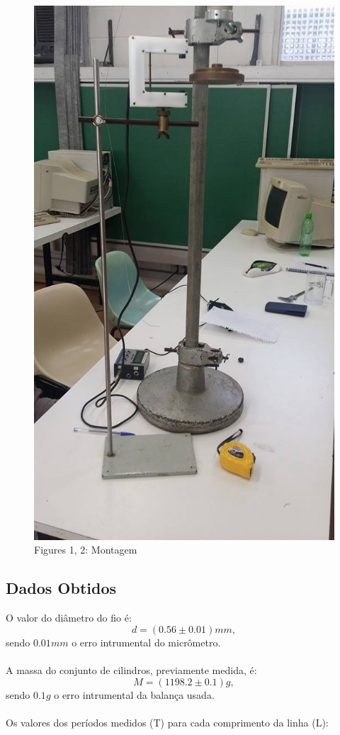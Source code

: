 \documentclass[12pt,a4paper]{article}
\begin{document}
\begin{figure}[!htbp]
	\includegraphics[scale=0.30]{02.jpg}\\
	Figures 1, 2: Montagem
\end{figure}

\subsection{Dados Obtidos}
O valor do diâmetro do fio é:
$$ d = (0.56 \pm 0.01) mm, $$
sendo $0.01 mm$ o erro intrumental do micrômetro.\\\\
A massa do conjunto de cilindros, previamente medida, é:
$$ M = (1198.2 \pm 0.1) g,$$
sendo $0.1 g$ o erro intrumental da balança usada.\\\\
Os valores dos períodos medidos (T) para cada comprimento da linha (L): %
\end{document}
